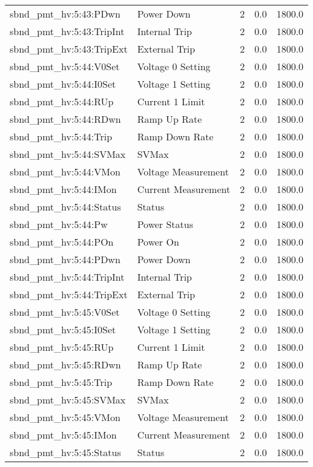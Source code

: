 \begin{center}
\begin{longtable}{l | l l l l }
sbnd\_pmt\_hv:5:43:PDwn & Power Down & 2 & 0.0 & 1800.0\\ 
sbnd\_pmt\_hv:5:43:TripInt & Internal Trip & 2 & 0.0 & 1800.0\\ 
sbnd\_pmt\_hv:5:43:TripExt & External Trip & 2 & 0.0 & 1800.0\\ 
sbnd\_pmt\_hv:5:44:V0Set & Voltage 0 Setting & 2 & 0.0 & 1800.0\\ 
sbnd\_pmt\_hv:5:44:I0Set & Voltage 1 Setting & 2 & 0.0 & 1800.0\\ 
sbnd\_pmt\_hv:5:44:RUp & Current 1 Limit & 2 & 0.0 & 1800.0\\ 
sbnd\_pmt\_hv:5:44:RDwn & Ramp Up Rate & 2 & 0.0 & 1800.0\\ 
sbnd\_pmt\_hv:5:44:Trip & Ramp Down Rate & 2 & 0.0 & 1800.0\\ 
sbnd\_pmt\_hv:5:44:SVMax & SVMax & 2 & 0.0 & 1800.0\\ 
sbnd\_pmt\_hv:5:44:VMon & Voltage Measurement & 2 & 0.0 & 1800.0\\ 
sbnd\_pmt\_hv:5:44:IMon & Current Measurement & 2 & 0.0 & 1800.0\\ 
sbnd\_pmt\_hv:5:44:Status & Status & 2 & 0.0 & 1800.0\\ 
sbnd\_pmt\_hv:5:44:Pw & Power Status & 2 & 0.0 & 1800.0\\ 
sbnd\_pmt\_hv:5:44:POn & Power On & 2 & 0.0 & 1800.0\\ 
sbnd\_pmt\_hv:5:44:PDwn & Power Down & 2 & 0.0 & 1800.0\\ 
sbnd\_pmt\_hv:5:44:TripInt & Internal Trip & 2 & 0.0 & 1800.0\\ 
sbnd\_pmt\_hv:5:44:TripExt & External Trip & 2 & 0.0 & 1800.0\\ 
sbnd\_pmt\_hv:5:45:V0Set & Voltage 0 Setting & 2 & 0.0 & 1800.0\\ 
sbnd\_pmt\_hv:5:45:I0Set & Voltage 1 Setting & 2 & 0.0 & 1800.0\\ 
sbnd\_pmt\_hv:5:45:RUp & Current 1 Limit & 2 & 0.0 & 1800.0\\ 
sbnd\_pmt\_hv:5:45:RDwn & Ramp Up Rate & 2 & 0.0 & 1800.0\\ 
sbnd\_pmt\_hv:5:45:Trip & Ramp Down Rate & 2 & 0.0 & 1800.0\\ 
sbnd\_pmt\_hv:5:45:SVMax & SVMax & 2 & 0.0 & 1800.0\\ 
sbnd\_pmt\_hv:5:45:VMon & Voltage Measurement & 2 & 0.0 & 1800.0\\ 
sbnd\_pmt\_hv:5:45:IMon & Current Measurement & 2 & 0.0 & 1800.0\\ 
sbnd\_pmt\_hv:5:45:Status & Status & 2 & 0.0 & 1800.0\\ 

\end{longtable}
\end{center}
